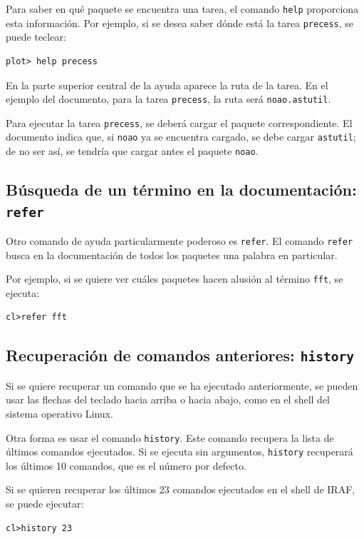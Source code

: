 Para saber en qué paquete se encuentra una tarea, el comando \texttt{help} proporciona esta información. Por ejemplo, si se desea saber dónde está la tarea \texttt{precess}, se puede teclear:

\begin{verbatim}
plot> help precess
\end{verbatim}

En la parte superior central de la ayuda aparece la ruta de la tarea. En el ejemplo del documento, para la tarea \texttt{precess}, la ruta será \texttt{noao.astutil}.

Para ejecutar la tarea \texttt{precess}, se deberá cargar el paquete correspondiente. El documento indica que, si \texttt{noao} ya se encuentra cargado, se debe cargar \texttt{astutil}; de no ser así, se tendría que cargar antes el paquete \texttt{noao}.

\subsection{Búsqueda de un término en la documentación: \texttt{refer}}

Otro comando de ayuda particularmente poderoso es \texttt{refer}. El comando \texttt{refer} busca en la documentación de todos los paquetes una palabra en particular.

Por ejemplo, si se quiere ver cuáles paquetes hacen alusión al término \texttt{fft}, se ejecuta:

\begin{verbatim}
cl>refer fft
\end{verbatim}

\subsection{Recuperación de comandos anteriores: \texttt{history}}

Si se quiere recuperar un comando que se ha ejecutado anteriormente, se pueden usar las flechas del teclado hacia arriba o hacia abajo, como en el shell del sistema operativo Linux.

Otra forma es usar el comando \texttt{history}. Este comando recupera la lista de últimos comandos ejecutados. Si se ejecuta sin argumentos, \texttt{history} recuperará los últimos 10 comandos, que es el número por defecto.

Si se quieren recuperar los últimos 23 comandos ejecutados en el shell de IRAF, se puede ejecutar:

\begin{verbatim}
cl>history 23
\end{verbatim}

